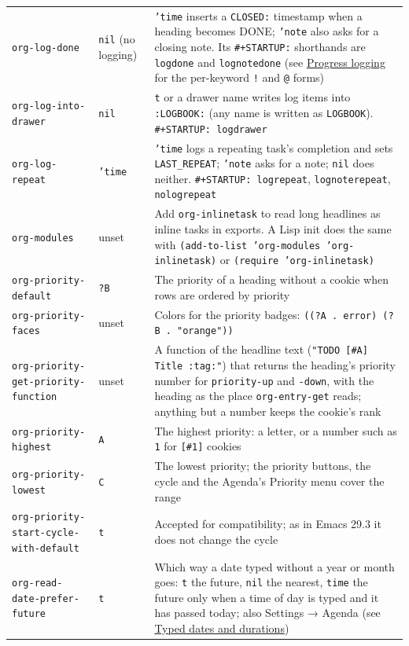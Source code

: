 \documentclass[11pt]{article}
\begin{document}
\begin{center}
\begin{tabular}{lll}
\texttt{org-log-done} & \texttt{nil} (no logging) & \texttt{'time} inserts a \texttt{CLOSED:} timestamp when a heading becomes DONE; \texttt{'note} also asks for a closing note. Its \texttt{\#+STARTUP:} shorthands are \texttt{logdone} and \texttt{lognotedone} (see \hyperref[sec:orgfbb8a58]{Progress logging} for the per-keyword \texttt{!} and \texttt{@} forms)\\[0pt]
\texttt{org-log-into-drawer} & \texttt{nil} & \texttt{t} or a drawer name writes log items into \texttt{:LOGBOOK:} (any name is written as \texttt{LOGBOOK}). \texttt{\#+STARTUP: logdrawer}\\[0pt]
\texttt{org-log-repeat} & \texttt{'time} & \texttt{'time} logs a repeating task's completion and sets \texttt{LAST\_REPEAT}; \texttt{'note} asks for a note; \texttt{nil} does neither. \texttt{\#+STARTUP: logrepeat}, \texttt{lognoterepeat}, \texttt{nologrepeat}\\[0pt]
\texttt{org-modules} & unset & Add \texttt{org-inlinetask} to read long headlines as inline tasks in exports. A Lisp init does the same with \texttt{(add-to-list 'org-modules 'org-inlinetask)} or \texttt{(require 'org-inlinetask)}\\[0pt]
\texttt{org-priority-default} & \texttt{?B} & The priority of a heading without a cookie when rows are ordered by priority\\[0pt]
\texttt{org-priority-faces} & unset & Colors for the priority badges: \texttt{((?A . error) (?B . "orange"))}\\[0pt]
\texttt{org-priority-get-priority-function} & unset & A function of the headline text (\texttt{"TODO [\#A] Title :tag:"}) that returns the heading's priority number for \texttt{priority-up} and \texttt{-down}, with the heading as the place \texttt{org-entry-get} reads; anything but a number keeps the cookie's rank\\[0pt]
\texttt{org-priority-highest} & \texttt{A} & The highest priority: a letter, or a number such as \texttt{1} for \texttt{[\#1]} cookies\\[0pt]
\texttt{org-priority-lowest} & \texttt{C} & The lowest priority; the priority buttons, the cycle and the Agenda's Priority menu cover the range\\[0pt]
\texttt{org-priority-start-cycle-with-default} & \texttt{t} & Accepted for compatibility; as in Emacs 29.3 it does not change the cycle\\[0pt]
\texttt{org-read-date-prefer-future} & \texttt{t} & Which way a date typed without a year or month goes: \texttt{t} the future, \texttt{nil} the nearest, \texttt{time} the future only when a time of day is typed and it has passed today; also Settings → Agenda (see \hyperref[sec:org14be048]{Typed dates and durations})\\[0pt]

\end{tabular}
\end{center}
\end{document}
